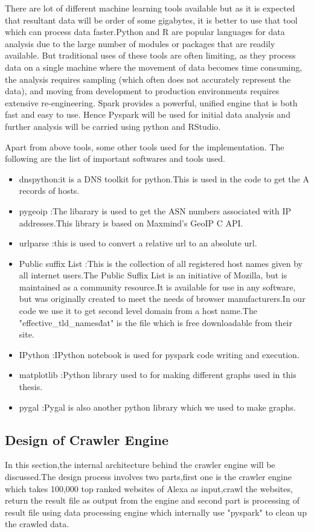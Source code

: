 There are lot of different machine learning tools available but as it is expected that resultant data will be order of some gigabytes, it is better to use that tool which can process data faster.Python and R are popular languages for data analysis due to the large number of modules or packages that are readily available. But traditional uses of these tools are often limiting, as they process data on a single machine where the movement of data becomes time consuming, the analysis requires sampling (which often does not accurately represent the data), and moving from development to production environments requires extensive re-engineering. Spark provides a powerful, unified engine that is both fast and easy to use. Hence Pyspark will be used for initial data analysis and further analysis will be carried using python and RStudio.

Apart from above tools, some other tools used for the implementation. The following are the list of important softwares and tools used.

\begin{itemize}
  \item dnspython:it is a DNS toolkit for python.This is used in the code to get the A records of hosts.
  \item pygeoip :The libarary is used to get the ASN numbers associated with IP addresses.This library is based on Maxmind’s GeoIP C API.
  \item urlparse :this is used to convert a relative url to an absolute url.
  \item Public suffix List :This is the collection of all registered host names given by all internet users.The Public Suffix List is an initiative of Mozilla, but is maintained as a community resource.It is available for use in any software, but was originally created to meet the needs of browser manufacturers.In our code we use it to get second level domain from a host name.The "effective\_tld\_names\. dat" is the file which is free downloadable from their site.
  \item IPython :IPython notebook is used for pyspark code writing and execution.
  \item matplotlib :Python library used to for making different graphs used in this thesis.
  \item pygal :Pygal is also another python library which we used to make graphs.
\end{itemize}

\subsection{Design of Crawler Engine}
In this section,the internal architecture behind the crawler engine will be discussed.The design process involves two parts,first one is the crawler engine which takes 100,000 top ranked websites of Alexa as input,crawl the websites, return the result file as output from the engine and second part is processing of result file using data processing engine which internally use "pyspark" to clean up the crawled data.

